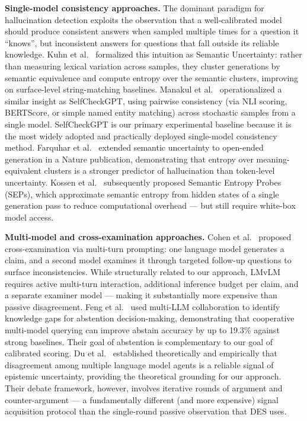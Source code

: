 \documentclass[journal]{IEEEtran}
\begin{document}
\textbf{Single-model consistency approaches.}
The dominant paradigm for hallucination detection exploits the observation
that a well-calibrated model should produce consistent answers when sampled
multiple times for a question it ``knows'', but inconsistent answers for
questions that fall outside its reliable knowledge.
Kuhn et al.~\cite{kuhn2023semantic} formalized this intuition as Semantic
Uncertainty: rather than measuring lexical variation across samples, they
cluster generations by semantic equivalence and compute entropy over the
semantic clusters, improving on surface-level string-matching baselines.
Manakul et al.~\cite{manakul2023selfcheckgpt} operationalized a similar
insight as SelfCheckGPT, using pairwise consistency (via NLI scoring,
BERTScore, or simple named entity matching) across stochastic samples from
a single model.
SelfCheckGPT is our primary experimental baseline because it is the most
widely adopted and practically deployed single-model consistency method.
Farquhar et al.~\cite{farquhar2024detecting} extended semantic uncertainty
to open-ended generation in a Nature publication, demonstrating that
entropy over meaning-equivalent clusters is a stronger predictor of
hallucination than token-level uncertainty.
Kossen et al.~\cite{kossen2024sep} subsequently proposed Semantic Entropy
Probes (SEPs), which approximate semantic entropy from hidden states of a
single generation pass to reduce computational overhead --- but still require
white-box model access.

\textbf{Multi-model and cross-examination approaches.}
Cohen et al.~\cite{cohen2023lm} proposed cross-examination via multi-turn
prompting: one language model generates a claim, and a second model
examines it through targeted follow-up questions to surface inconsistencies.
While structurally related to our approach, LMvLM requires active multi-turn
interaction, additional inference budget per claim, and a separate examiner
model --- making it substantially more expensive than passive disagreement.
Feng et al.~\cite{feng2024dont} used multi-LLM collaboration to identify
knowledge gaps for abstention decision-making, demonstrating that
cooperative multi-model querying can improve abstain accuracy by up to
19.3\% against strong baselines.
Their goal of abstention is complementary to our goal of calibrated scoring.
Du et al.~\cite{du2024multiagent} established theoretically and empirically
that disagreement among multiple language model agents is a reliable signal
of epistemic uncertainty, providing the theoretical grounding for our approach.
Their debate framework, however, involves iterative rounds of argument and
counter-argument --- a fundamentally different (and more expensive) signal
acquisition protocol than the single-round passive observation that DES uses.
\end{document}
